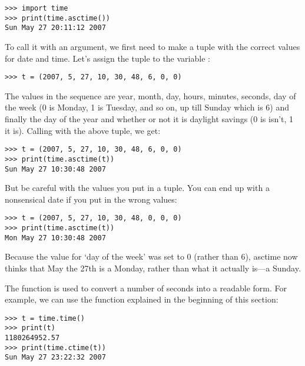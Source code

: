 \begin{listingignore}
\begin{verbatim}
>>> import time
>>> print(time.asctime())
Sun May 27 20:11:12 2007
\end{verbatim}
\end{listingignore}

\noindent
To call it with an argument, we first need to make a tuple with the correct values for date and time.  Let's assign the tuple to the variable :

\begin{listing}
\begin{verbatim}
>>> t = (2007, 5, 27, 10, 30, 48, 6, 0, 0)
\end{verbatim}
\end{listing}

\noindent
The values in the sequence are year, month, day, hours, minutes, seconds, day of the week (0 is Monday, 1 is Tuesday, and so on, up till Sunday which is 6) and finally the day of the year and whether or not it is daylight savings (0 is isn't, 1 it is). Calling  with the above tuple, we get:

\begin{listing}
\begin{verbatim}
>>> t = (2007, 5, 27, 10, 30, 48, 6, 0, 0)
>>> print(time.asctime(t))
Sun May 27 10:30:48 2007
\end{verbatim}
\end{listing}

\noindent
But be careful with the values you put in a tuple. You can end up with a nonsensical date if you put in the wrong values:

\begin{listing}
\begin{verbatim}
>>> t = (2007, 5, 27, 10, 30, 48, 0, 0, 0)
>>> print(time.asctime(t))
Mon May 27 10:30:48 2007
\end{verbatim}
\end{listing}

\noindent
Because the value for `day of the week' was set to 0 (rather than 6), asctime now thinks that May the 27th is a Monday, rather than what it actually is---a Sunday.

The function  is used to convert a number of seconds into a readable form.  For example, we can use the  function explained in the beginning of this section:

\begin{listingignore}
\begin{verbatim}
>>> t = time.time()
>>> print(t)
1180264952.57
>>> print(time.ctime(t))
Sun May 27 23:22:32 2007
\end{verbatim}
\end{listingignore}

